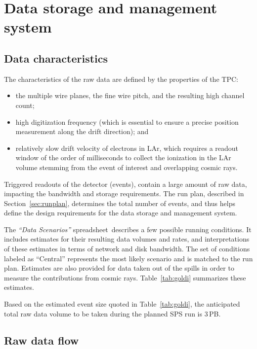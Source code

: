 \section{Data storage and management system}

\subsection{Data characteristics}
The characteristics of the raw \pdsp data are defined by the
properties of the TPC:
\begin{itemize}
\item the multiple wire planes, the fine wire pitch, and the resulting high channel count;
\item high digitization frequency (which is essential to ensure a precise position measurement along the drift direction); and
\item relatively slow drift velocity of electrons in LAr, which requires a readout window of the order of milliseconds  to collect
the ionization in the LAr volume stemming from the event of interest and overlapping cosmic rays.
\end{itemize}

Triggered readouts of the detector (events), 
contain a large amount of raw data, impacting the bandwidth and
storage requirements.   The run plan, described in Section~\ref{sec:runplan},  determines the total number of events, and thus 
helps define the design requirements for the data storage and management system.

The \textit{``\pdsp Data Scenarios''} spreadsheet\,\cite{data_spreadsheet}  %
describes a few possible running conditions. It includes estimates for their
resulting data volumes and rates, and interpretations of these estimates in terms of
network and disk bandwidth. The set of conditions labeled as ``Central'' represents the most likely scenario
and is matched to the run plan.
Estimates are also provided for data taken out of the spills in order to measure the contributions from cosmic rays.
Table~\ref{tab:goldi} summarizes these estimates.

Based on the estimated event size quoted in Table~\ref{tab:goldi},  the anticipated total raw data volume to be 
taken during the planned SPS run is 3\,PB.



\subsection{Raw data flow}
\label{sec:raw_concept}

